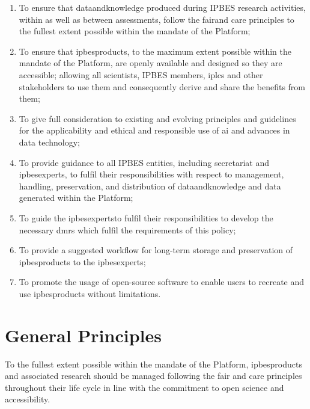 \documentclass{article}
\begin{document}
\begin{enumerate}[label=(\alph*)]
    \item To ensure that \gls{dataandknowledge} produced during IPBES \gls{research} activities, within as well as between assessments, follow the \gls{fair}and \gls{care} principles to the fullest extent possible within the mandate of the Platform;
    
    \item To ensure that \glspl{ipbesproduct}, to the maximum extent possible within the mandate of the Platform, are openly available and designed so they are accessible; allowing all scientists, IPBES members, \glspl{iplc} and other \glspl{stakeholder} to use them and consequently derive and share the benefits from them;

    \item To give full consideration to existing and evolving principles and guidelines for the applicability and
    ethical and responsible use of \gls{ai} and advances in data technology;

    \item To provide guidance to all IPBES entities, including \gls{secretariat} and \glspl{ipbesexpert}, to fulfil their
    responsibilities with respect to management, handling, preservation, and distribution of \gls{dataandknowledge} and \gls{data} generated within the Platform;
    
    \item To guide the \glspl{ipbesexpert}to fulfil their responsibilities to develop the necessary \glspl{dmr} which fulfil the requirements of this policy;
    
    \item To provide a suggested \gls{workflow} for long-term storage and preservation of \glspl{ipbesproduct} to the \glspl{ipbesexpert};
    
    \item To promote the usage of open-source software to enable users to recreate and use \glspl{ipbesproduct} without limitations.
\end{enumerate}


\section{General Principles}

To the fullest extent possible within the mandate of the Platform, \glspl{ipbesproduct} and associated \gls{research} should be managed following the \gls{fair} and \gls{care} principles throughout their life cycle in line with the commitment to open science and accessibility.
\end{document}
